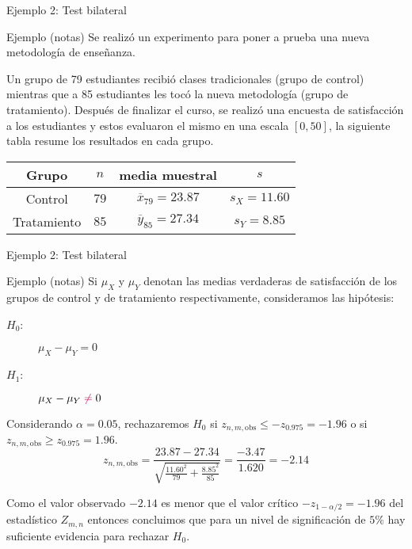 \documentclass{beamer}
\theoremstyle{definition}
\begin{document}
\begin{frame}{\color{rosee} Ejemplo 2: Test bilateral} \small
 \begin{exampleblock}{Ejemplo (notas)}
   Se realiz\'o un experimento para poner a prueba una nueva
   metodolog\'ia de ense\~nanza.

   \medskip Un grupo de 79 estudiantes recibi\'o clases tradicionales
   (grupo de control) mientras que a 85 estudiantes les toc\'o la nueva metodolog\'ia (grupo de tratamiento). Después de finalizar el curso, se realizó una encuesta de satisfacción a los estudiantes y estos evaluaron el mismo en una escala $[0,50]$, la siguiente tabla resume los resultados en cada grupo.
   \begin{table}
     \centering
     \begin{tabular}{cccc}
       \hline
       Grupo & $n$ & media muestral & $s$ \\
       \hline
       Control & $79$ & $\overline{x}_{79}=23.87$ & $s_X=11.60$\\
       Tratamiento & $85$ & $\overline{y}_{85}=27.34$ & $s_Y=8.85$\\
       \hline
     \end{tabular}
   \end{table}
 \end{exampleblock}
\end{frame}
%
\begin{frame}{\color{rosee} Ejemplo 2: Test bilateral} \small
 \begin{exampleblock}{Ejemplo (notas)}
   Si $\mu_X$ y $\mu_Y$ denotan las medias verdaderas de satisfacción de los grupos de control y de tratamiento respectivamente, consideramos las hip\'otesis:
   \begin{description}
   \item[$H_0$:] $\mu_X - \mu_Y = 0$
   \item[$H_1$:] $\mu_X - \mu_Y \color{rosee}\neq\color{black} 0$ 
   \end{description}
   Considerando $\alpha=0.05$, rechazaremos $H_0$ si $z_{n,m,\text{obs}} \leq -z_{0.975} = -1.96$ o si $z_{n,m,\text{obs}} \geq z_{0.975} = 1.96$.
   \[z_{n,m,\text{obs}}= \frac{23.87 -
       27.34}{\sqrt{\frac{11.60^2}{79}+\frac{8.85^2}{85}}} =
     \frac{-3.47}{1.620}= -2.14 \] 
     
     Como el valor observado $-2.14$ es menor que el valor cr\'itico $-z_{1- \alpha/2}=-1.96$ del estad\'istico $Z_{m,n}$ entonces concluimos que para un nivel de significaci\'on de $5 \%$  hay suficiente evidencia para rechazar $H_0$.
     

 \end{exampleblock}
\end{frame}
\end{document}

